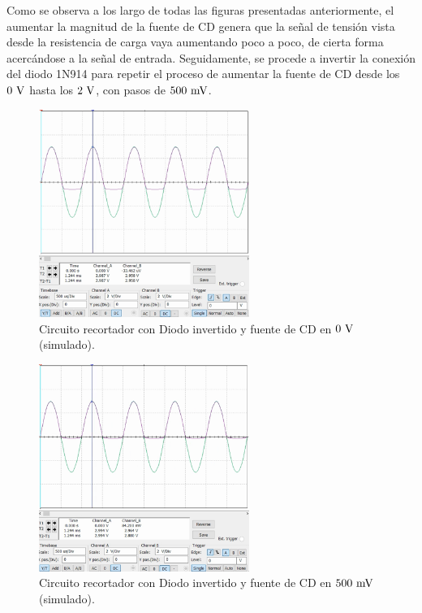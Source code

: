\documentclass[journal]{IEEEtran}
\begin{document}
Como se observa a los largo de todas las figuras presentadas anteriormente, el aumentar la magnitud de la fuente de CD
genera que la señal de tensión vista desde la resistencia de carga vaya aumentando poco a poco, de cierta forma acercándose 
a la señal de entrada. Seguidamente, se procede a invertir la conexión del diodo 1N914 para repetir el proceso de aumentar 
la fuente de CD desde los $0~\textnormal{V}$ hasta los $2~\textnormal{V}$, con pasos de $500~\textnormal{mV}$.
\begin{figure}[H]
        \centering
        \includegraphics[width=2.7in]{SignalSimulated_10.png}
        \caption{Circuito recortador con Diodo invertido y fuente de CD en $0~\textnormal{V}$ (simulado).}
        \label{fig:SignalSimulated_10}
\end{figure}
\begin{figure}[H]
        \centering
        \includegraphics[width=2.7in]{SignalSimulated_11.png}
        \caption{Circuito recortador con Diodo invertido y fuente de CD en $500~\textnormal{mV}$ (simulado).}
        \label{fig:SignalSimulated_11}
\end{figure}
\end{document}

